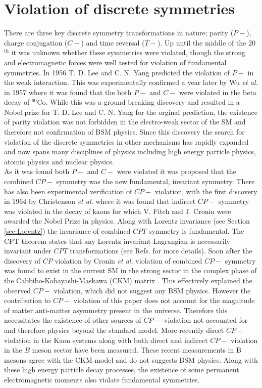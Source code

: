 \documentclass[8pt,a4paper, twoside]{report}
\begin{document}
\section{Violation of discrete symmetries}
There are three key discrete symmetry transformations in nature; parity ($P-$), charge conjugation ($C-$) and time reversal ($T-$). Up until the middle of the 20$^{\text{th}}$ it was unknown whether these symmetries were violated, though the strong and electromagnetic forces were well tested for violation of fundamental symmetries.  In 1956 T. D. Lee and C. N. Yang predicted the violation of $P-$ in the weak interaction\cite{Yang1956}.  This was experimentally confirmed a year later  by Wu \textit{et al.} in 1957 \cite{Wu1957} where it was found that the both $P-$ and $C-$ were violated in the beta decay of $^{60}$Co. While this was a ground breaking discovery and resulted in a Nobel prize for  T. D. Lee and C. N. Yang for the orginal prediction, the existence of parity violation was not forbidden in the electro-weak sector of the SM and therefore not confirmation of BSM physics.   Since this discovery the search for violation of the discrete symmetries in other mechanisms has rapidly expanded and now spans many disciplines of physics including high energy particle physics, atomic physics and nuclear physics. \\

As it was found both $P-$ and $C-$ were violated it was proposed that the combined $CP-$ symmetry was the new fundamental, invariant symmetry. There has also been experimental verification of $CP-$ violation, with the first discovery in 1964 by Christenson \textit{et al.} \cite{Christenson1964} where it was found that indirect $CP-$ symmetry was violated in the decay of kaons for which V. Fitch and J. Cronin  were awarded the Nobel Prize in physics.   Along with Lorentz invariance (see Section \ref{sec:Lorentz}) the invariance of combined $CPT$ symmetry is fundamental. The CPT theorem states that any Lorentz invariant Lagrangian is necessarily invariant under $CPT$ transformations (see Refs. \cite{LandauVol4, KhriplovichCP, HenleyCP} for more details). Soon after the discovery of $CP$ violation by Cronin \textit{et al.} violation of combined $CP-$ symmetry was found to exist in the current SM in the strong sector in the complex phase of the Cabbibo-Kobayashi-Maskawa (CKM) matrix \cite{Cabibbo1963, KM1973}. This effectively explained the observed $CP-$ violation, which did not suggest any BSM physics.  However the contribution to $CP-$ violation of this paper does not account for the magnitude of matter anti-matter asymmetry present in the universe. Therefore this necessitates the existence of other sources of $CP-$ violation not accounted for and therefore physics beyond the standard model. More recently direct $CP-$ violation in the Kaon systems \cite{Alavi1999, Fanti1999} along with both direct and indirect $CP-$ violation in the $B$ meson sector \cite{Belle2001, Aaij2013, Aubert2003} have been measured. These recent measurements in B mesons agree with the CKM model and do not suggests BSM physics. Along with these high energy particle decay processes, the existence of some permanent electromagnetic moments also violate fundamental symmetries.\\
\end{document}
